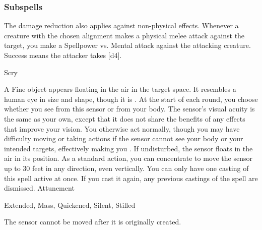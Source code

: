 \subsubsection{Subspells}
The damage reduction also applies against non-physical effects.
Whenever a creature with the chosen alignment makes a physical melee attack against the target, you make a Spellpower vs. Mental attack against the attacking creature.
Success means the attacker takes [d4].
\begin{spellsection}{Scry}
\begin{spellheader}
\end{spellheader}
\begin{spellcontent}
\begin{spelltargetinginfo}
\end{spelltargetinginfo}
\begin{spelleffects}
\spelleffect
A Fine object appears floating in the air in the target space.
It resembles a human eye in size and shape, though it is .
At the start of each round, you choose whether you see from this sensor or from your body.
The sensor's visual acuity is the same as your own, except that it does not share the benefits of any  effects that improve your vision.
You otherwise act normally, though you may have difficulty moving or taking actions if the sensor cannot see your body or your intended targets, effectively making you \blinded.
If undisturbed, the sensor floats in the air in its position.
As a standard action, you can concentrate to move the sensor up to 30 feet in any direction, even vertically.
You can only have one casting of this spell active at once.
If you cast it again, any previous castings of the spell are dismissed.
\spelldur Attunement
\end{spelleffects}
\end{spellcontent}
\begin{spellfooter}
 Extended, Mass, Quickened, Silent, Stilled
\end{spellfooter}
\begin{spellsubcontent}
\begin{spellcantrip}
The sensor cannot be moved after it is originally created.
\end{spellcantrip}
\end{spellsubcontent}
\end{spellsection}
